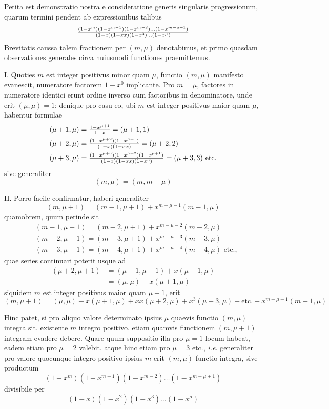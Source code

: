 \documentclass[twoside,12pt]{memoir}
\let\oldfrac\frac
\def\frac#1#2{\mathchoice{\tfrac{#1}{#2}}{\oldfrac{#1}{#2}}{\genfrac{}{}{}{2}{#1}{#2\mathstrut}}{\genfrac{}{}{}{3}{#1}{#2\mathstrut}}}
\begin{document}
Petita est demonstratio nostra e consideratione generis singularis progressionum, quarum termini pendent ab expressionibus talibus
\[\frac{(1-x^{m})(1-x^{m-1})(1-x^{m-2}) \ldots(1-x^{m-\mu+1})}{(1-x)(1-x x)(1-x^{3}) \ldots (1-x^{\mu})}\]
Brevitatis caussa talem fractionem per \((m, \mu)\) denotabimus, et primo quasdam observationes generales circa huiusmodi functiones praemittemus.

I. Quoties \(m\) est integer positivus minor quam \(\mu\), functio \((m, \mu)\) manifesto evanescit, numeratore factorem \(1-x^{0}\) implicante. Pro \(m=\mu\), factores in numeratore identici erunt ordine inverso cum factoribus in denominatore, unde erit \((\mu, \mu)=1\): denique pro casu eo, ubi \(m\) est integer positivus maior quam \(\mu\), habentur formulae
\[\begin{aligned}
& (\mu+1, \mu)=\frac{1-x^{\mu+1}}{1-x}=(\mu+1,1) \\
& (\mu+2, \mu)=\frac{(1-x^{\mu+2})(1-x^{\mu+1})}{(1-x)(1-x x)}=(\mu+2,2) \\
& (\mu+3, \mu)=\frac{(1-x^{\mu+3})(1-x^{\mu+2})(1-x^{\mu+1})}{(1-x)(1-xx)(1-x^{3})}=(\mu+3,3) \text{ etc.}
\end{aligned}\]\pagebreak%
sive generaliter
\[(m, \mu)=(m, m-\mu)\]

II. Porro facile confirmatur, haberi generaliter
\[(m, \mu+1)=(m-1, \mu+1)+x^{m-\mu-1}(m-1, \mu)\]
quamobrem, quum perinde sit
\[\begin{aligned}
& (m-1, \mu+1)=(m-2, \mu+1)+x^{m-\mu-2}(m-2, \mu) \\
& (m-2, \mu+1)=(m-3, \mu+1)+x^{m-\mu-3}(m-3, \mu) \\
& (m-3, \mu+1)=(m-4, \mu+1)+x^{m-\mu-4}(m-4, \mu) \text{ etc.,}
\end{aligned}\]
quae series continuari poterit usque ad
\[\begin{aligned}
(\mu+2, \mu+1) & =(\mu+1, \mu+1)+x(\mu+1, \mu) \\
& =(\mu, \mu)+x(\mu+1, \mu)
\end{aligned}\]
siquidem \(m\) est integer positivus maior quam \(\mu+1\), erit
\[(m, \mu+1)=(\mu, \mu) +x(\mu+1, \mu)+x x(\mu+2, \mu)+x^{3}(\mu+3, \mu)+\text{etc{.}} +x^{m-\mu-1}(m-1, \mu)\]

Hinc patet, si pro aliquo valore determinato ipsius \(\mu\) quaevis functio \((m, \mu)\) integra sit, existente \(m\) integro positivo, etiam quamvis functionem \((m, \mu+1)\) integram evadere debere. Quare quum suppositio illa pro \(\mu=1\) locum habeat, eadem etiam pro \(\mu=2\) valebit, atque hinc etiam pro \(\mu=3\) etc., \textit{i.e.} generaliter pro valore quocunque integro positivo ipsius \(m\) erit \((m, \mu)\) functio integra, sive productum
\[(1-x^{m})(1-x^{m-1})(1-x^{m-2}) \ldots(1-x^{m-\mu+1})\]
divisibile per
\[(1-x)(1-x^{2})(1-x^{3}) \ldots(1-x^{\mu})\]
\end{document}
